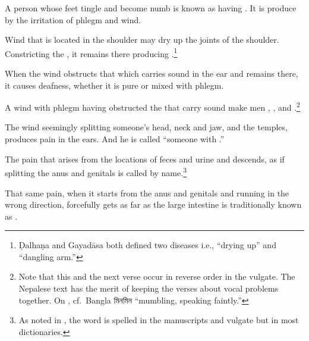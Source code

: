 \begin{translation}
\item[81]

A person whose feet tingle and become numb is known as having 
.  It is produce by the irritation of phlegm and 
wind. 

\item[82]

Wind that is located in the shoulder may dry up the joints of the shoulder.  
Constricting the , it remains there producing 
.\footnote{Ḍalhaṇa and Gayadāsa both 
    	defined two diseases i.e., “drying up” and “dangling arm.”}

\item[83]

When the wind obstructs that which carries sound in the ear and remains there, 
it causes  deafness, whether it is pure or mixed with phlegm.

\item[85]

A wind with phlegm having obstructed the  that
carry sound make men , , 
 and
.\footnote{Note that this and the next verse
    occur in reverse order in the vulgate.  The Nepalese text has 
    the merit of keeping
    the verses about vocal problems together. 
    On , cf.\ Bangla \textbengali{মিনমিন} “mumbling, 
    speaking faintly.”}

\item[84]

The wind seemingly splitting someone's head, neck and jaw, and
the temples, produces pain in the ears. And he is called “someone with
.”

\item[86]

The pain that arises from the locations of feces and urine and
descends, as if splitting the anus and genitals is called
 by name.\footnote{As noted in \cite[124,
    n.\,74]{wuja-2003}, the word is spelled  in the manuscripts
    and vulgate but  in most dictionaries.}

\item[87] 

That same pain, when it starts from the anus and genitals and running
in the wrong direction, forcefully gets as far as the large intestine
is traditionally known as .


\end{translation}

